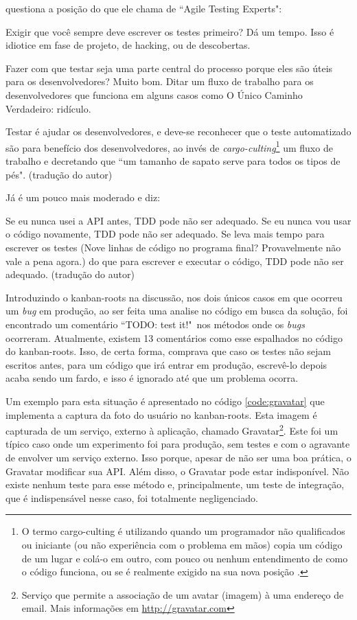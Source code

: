  questiona a posição do que ele chama de ``Agile Testing Experts":

\begin{citacao}
Exigir que você sempre deve escrever os testes primeiro? Dá um tempo. Isso é idiotice em fase de projeto, de hacking, ou de descobertas.

Fazer com que testar seja uma parte central do processo porque eles são úteis para os desenvolvedores? Muito bom. Ditar um fluxo de trabalho para os desenvolvedores que funciona em alguns casos como O Único Caminho Verdadeiro: ridículo.

Testar é ajudar os desenvolvedores, e deve-se reconhecer que o teste automatizado são para benefício dos desenvolvedores, ao invés de \textit{cargo-culting}\footnote{O termo cargo-culting é utilizando quando um programador não qualificados ou iniciante (ou não experiência com o problema em mãos) copia um código de um lugar e colá-o em outro, com pouco ou nenhum entendimento de como o código funciona, ou se é realmente exigido na sua nova posição \cite{CargoCulting}.} um fluxo de trabalho e decretando que ``um tamanho de sapato serve para todos os tipos de pés". (tradução do autor)
\end{citacao}

Já  é um pouco mais moderado e diz:

\begin{citacao}
Se eu nunca usei a API antes, TDD pode não ser adequado. Se eu nunca vou usar o código novamente, TDD pode não ser adequado. Se leva mais tempo para escrever os testes (Nove linhas de código no programa final? Provavelmente não vale a pena agora.) do que para escrever e executar o código, TDD pode não ser adequado. (tradução do autor)
\end{citacao}

Introduzindo o kanban-roots na discussão, nos dois únicos casos em que ocorreu um \textit{bug} em produção, ao ser feita uma analise no código em busca da solução, foi encontrado um comentário ``TODO: test it!"\ nos métodos onde os \textit{bugs} ocorreram. Atualmente, existem 13 comentários como esse espalhados no código do kanban-roots. Isso, de certa forma, comprava que caso os testes não sejam escritos antes, para um código que irá entrar em produção, escrevê-lo depois acaba sendo um fardo, e isso é ignorado até que um problema ocorra.

Um exemplo para esta situação é apresentado no código \ref{code:gravatar} que implementa a captura da foto do usuário no kanban-roots. Esta imagem é capturada de um serviço, externo à aplicação, chamado Gravatar\footnote{Serviço que permite a associação de um avatar (imagem) à uma endereço de email. Mais informações em \url{http://gravatar.com}}. Este foi um típico caso onde um experimento foi para produção, sem testes e com o agravante de envolver um serviço externo. Isso porque, apesar de não ser uma boa prática, o Gravatar modificar sua API. Além disso, o Gravatar pode estar indisponível. Não existe nenhum teste para esse método e, principalmente, um teste de integração, que é indispensável nesse caso, foi totalmente negligenciado.

